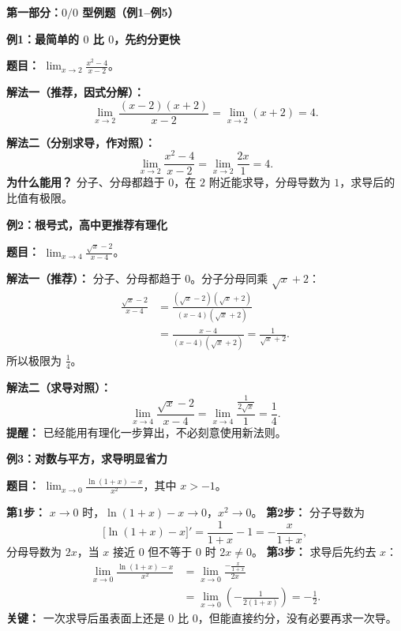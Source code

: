 \begin{examplebox}
\textbf{\textcolor{CExample}{第一部分：$0/0$ 型例题（例1--例5）}}



\textbf{\textcolor{CExample}{例1：最简单的 $0$ 比 $0$，先约分更快}}

\textbf{题目：} $\displaystyle\lim_{x\to2}\frac{x^2-4}{x-2}$。

\textbf{解法一（推荐，因式分解）：}
\[
\lim_{x\to2}\frac{(x-2)(x+2)}{x-2}
=\lim_{x\to2}(x+2)=4.
\]

\textbf{解法二（分别求导，作对照）：}
\[
\lim_{x\to2}\frac{x^2-4}{x-2}
=\lim_{x\to2}\frac{2x}{1}=4.
\]
\textbf{为什么能用？} 分子、分母都趋于 $0$，在 $2$ 附近能求导，分母导数为 $1$，求导后的比值有极限。

\medskip
\textbf{\textcolor{CExample}{例2：根号式，高中更推荐有理化}}

\textbf{题目：} $\displaystyle\lim_{x\to4}\frac{\sqrt{x}-2}{x-4}$。

\textbf{解法一（推荐）：} 分子、分母都趋于 $0$。分子分母同乘 $\sqrt{x}+2$：
\[
\begin{aligned}
\frac{\sqrt{x}-2}{x-4}
&=\frac{(\sqrt{x}-2)(\sqrt{x}+2)}{(x-4)(\sqrt{x}+2)}\\
&=\frac{x-4}{(x-4)(\sqrt{x}+2)}
=\frac1{\sqrt{x}+2}.
\end{aligned}
\]
所以极限为 $\frac14$。

\textbf{解法二（求导对照）：}
\[
\lim_{x\to4}\frac{\sqrt{x}-2}{x-4}
=\lim_{x\to4}\frac{\frac1{2\sqrt{x}}}{1}
=\frac14.
\]
\textbf{提醒：} 已经能用有理化一步算出，不必刻意使用新法则。

\medskip
\begin{minipage}{\linewidth}
\textbf{\textcolor{CExample}{例3：对数与平方，求导明显省力}}

\textbf{题目：} $\displaystyle\lim_{x\to0}\frac{\ln(1+x)-x}{x^2}$，其中 $x>-1$。
\end{minipage}

\textbf{第1步：} $x\to0$ 时，$\ln(1+x)-x\to0$，$x^2\to0$。
\textbf{第2步：} 分子导数为
\[
\bigl[\ln(1+x)-x\bigr]'=\frac1{1+x}-1=-\frac{x}{1+x},
\]
分母导数为 $2x$，当 $x$ 接近 $0$ 但不等于 $0$ 时 $2x\ne0$。
\textbf{第3步：} 求导后先约去 $x$：
\[
\begin{aligned}
\lim_{x\to0}\frac{\ln(1+x)-x}{x^2}
&=\lim_{x\to0}\frac{-\frac{x}{1+x}}{2x}\\
&=\lim_{x\to0}\left(-\frac1{2(1+x)}\right)
=\boxed{-\frac12}.
\end{aligned}
\]
\textbf{关键：} 一次求导后虽表面上还是 $0$ 比 $0$，但能直接约分，没有必要再求一次导。


\end{examplebox}
